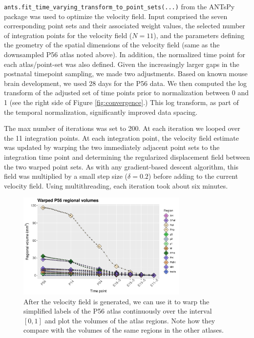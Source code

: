 \documentclass[
  12pt,
]{article}
\begin{document}
\texttt{ants.fit\_time\_varying\_transform\_to\_point\_sets(...)} from
the ANTsPy package was used to optimize the velocity field. Input
comprised the seven corresponding point sets and their associated weight
values, the selected number of integration points for the velocity field
(\(N=11\)), and the parameters defining the geometry of the spatial
dimensions of the velocity field (same as the downsampled P56 atlas
noted above). In addition, the normalized time point for each
atlas/point-set was also defined. Given the increasingly larger gaps in
the postnatal timepoint sampling, we made two adjustments. Based on
known mouse brain development, we used 28 days for the P56 data. We then
computed the log transform of the adjusted set of time points prior to
normalization between 0 and 1 (see the right side of Figure
\ref{fig:convergence}.) This log transform, as part of the temporal
normalization, significantly improved data spacing.

The max number of iterations was set to 200. At each iteration we looped
over the 11 integration points. At each integration point, the velocity
field estimate was updated by warping the two immediately adjacent point
sets to the integration time point and determining the regularized
displacement field between the two warped point sets. As with any
gradient-based descent algorithm, this field was multiplied by a small
step size (\(\delta = 0.2\)) before adding to the current velocity
field. Using multithreading, each iteration took about six minutes.

\begin{figure}[!htb]
\centering
\includegraphics[width=0.75\textwidth]{Figures/warpedP56Volumes.pdf}
\caption{After the velocity field is generated, we can use it to warp
the simplified labels of the P56 atlas continuously over the interval
$[0, 1]$ and plot the volumes of the atlas regions.  Note how they 
compare with the volumes of the same regions in the other atlases.}
\label{fig:warpedP56}
\end{figure}
\end{document}

